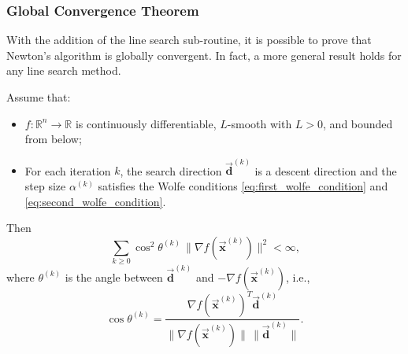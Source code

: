 \documentclass[9pt, headings=standardclasses, parskip=half]{scrartcl}
\newcommand{\vect}[1]{\vec{\boldsymbol{#1}}}
\begin{document}
\subsubsection{Global Convergence Theorem}

With the addition of the line search sub-routine, it is possible to prove that Newton's algorithm is globally convergent. In fact, a more general result holds for any line search method.

\begin{theorem}\label{thm:zoutendijk}
Assume that:
\begin{itemize}
  \item \(f:\mathbb{R}^{n}\to\mathbb{R}\) is continuously differentiable, \(L\)-smooth with \(L>0\), and bounded from below;
  \item For each iteration \(k\), the search direction \(\vect{d}^{(k)}\) is a descent direction and the step size \(\alpha^{(k)}\) satisfies the Wolfe conditions \eqref{eq:first_wolfe_condition} and \eqref{eq:second_wolfe_condition}.
\end{itemize}
Then
\[
\sum_{k \geq 0} \cos^2\theta^{(k)}\, \|\nabla f(\vect{x}^{(k)})\|^2 < \infty \text{,}
\]
where \(\theta^{(k)}\) is the angle between \(\vect{d}^{(k)}\) and \(-\nabla f(\vect{x}^{(k)})\), i.e.,
\[
\cos\theta^{(k)} = \frac{\nabla f(\vect{x}^{(k)})^T \vect{d}^{(k)}}{\|\nabla f(\vect{x}^{(k)})\|\,\|\vect{d}^{(k)}\|} \text{.}
\]
\end{theorem}
\end{document}
